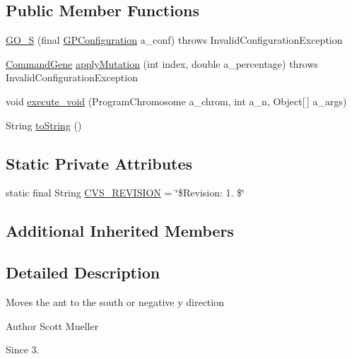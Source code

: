 \subsection*{Public Member Functions}
\begin{DoxyCompactItemize}
\item 
\hyperlink{classexamples_1_1gp_1_1painted_desert_1_1_g_o___s_abe0cee1e1ea95a2a30fecab6a5bfdff9}{G\-O\-\_\-\-S} (final \hyperlink{classorg_1_1jgap_1_1gp_1_1impl_1_1_g_p_configuration}{G\-P\-Configuration} a\-\_\-conf)  throws Invalid\-Configuration\-Exception 
\item 
\hyperlink{classorg_1_1jgap_1_1gp_1_1_command_gene}{Command\-Gene} \hyperlink{classexamples_1_1gp_1_1painted_desert_1_1_g_o___s_aa4bf044eb18b9d9e2d562f4e384fb174}{apply\-Mutation} (int index, double a\-\_\-percentage)  throws Invalid\-Configuration\-Exception 
\item 
void \hyperlink{classexamples_1_1gp_1_1painted_desert_1_1_g_o___s_aa9911906336796ffdbb0c084bb6b709b}{execute\-\_\-void} (Program\-Chromosome a\-\_\-chrom, int a\-\_\-n, Object\mbox{[}$\,$\mbox{]} a\-\_\-args)
\item 
String \hyperlink{classexamples_1_1gp_1_1painted_desert_1_1_g_o___s_a28e781d3fe8d19afb5ae2c59990b7ff9}{to\-String} ()
\end{DoxyCompactItemize}
\subsection*{Static Private Attributes}
\begin{DoxyCompactItemize}
\item 
static final String \hyperlink{classexamples_1_1gp_1_1painted_desert_1_1_g_o___s_a0eed133f3cef1e71eefa26a9ff5ef475}{C\-V\-S\-\_\-\-R\-E\-V\-I\-S\-I\-O\-N} = \char`\"{}\$Revision\-: 1. \$\char`\"{}
\end{DoxyCompactItemize}
\subsection*{Additional Inherited Members}


\subsection{Detailed Description}
Moves the ant to the south or negative y direction

\begin{DoxyAuthor}{Author}
Scott Mueller 
\end{DoxyAuthor}
\begin{DoxySince}{Since}
3. 
\end{DoxySince}


